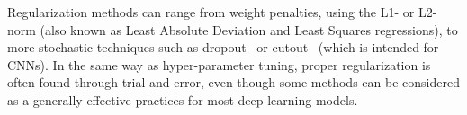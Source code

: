 Regularization methods can range from weight penalties, using the L1- or
L2-norm (also known as Least Absolute Deviation and Least Squares regressions),
to more stochastic techniques such as dropout~\cite{Dropout} or
cutout~\cite{Cutout} (which is intended for CNNs). In the same way as
hyper-parameter tuning, proper regularization is often found through trial and
error, even though some methods can be considered as a generally effective
practices for most deep learning models.

